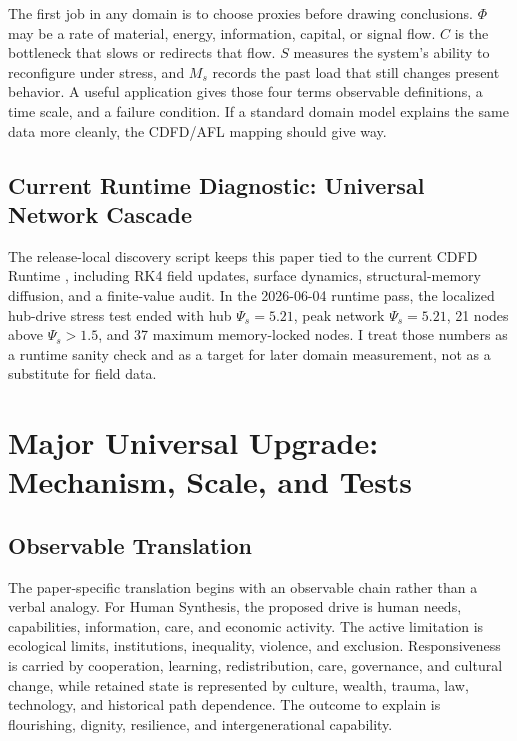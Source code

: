 \documentclass[11pt,a4paper]{article}
\begin{document}
The first job in any domain is to choose proxies before drawing conclusions. $\Phi$ may be a rate of material, energy, information, capital, or signal flow. $C$ is the bottleneck that slows or redirects that flow. $S$ measures the system's ability to reconfigure under stress, and $M_s$ records the past load that still changes present behavior. A useful application gives those four terms observable definitions, a time scale, and a failure condition. If a standard domain model explains the same data more cleanly, the CDFD/AFL mapping should give way.

\subsection{Current Runtime Diagnostic: Universal Network Cascade}
The release-local discovery script keeps this paper tied to the current CDFD Runtime \cite{CDFDRuntime2026}, including RK4 field updates, surface dynamics, structural-memory diffusion, and a finite-value audit. In the 2026-06-04 runtime pass, the localized hub-drive stress test ended with hub $\Psi_s=5.21$, peak network $\Psi_s=5.21$, 21 nodes above $\Psi_s>1.5$, and 37 maximum memory-locked nodes. I treat those numbers as a runtime sanity check and as a target for later domain measurement, not as a substitute for field data.


\section{Major Universal Upgrade: Mechanism, Scale, and Tests}

\subsection{Observable Translation}

The paper-specific translation begins with an observable chain rather than a
verbal analogy. For Human Synthesis, the proposed drive is human needs, capabilities, information, care, and economic activity.
The active limitation is ecological limits, institutions, inequality, violence, and exclusion. Responsiveness is carried by
cooperation, learning, redistribution, care, governance, and cultural change, while retained state is represented by
culture, wealth, trauma, law, technology, and historical path dependence. The outcome to explain is flourishing, dignity, resilience, and intergenerational capability.
\end{document}
